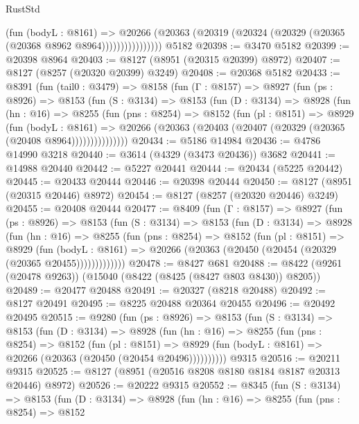 \begin{lexlean}{RustStd}
\begin{coremodule}
                      (fun (bodyL : @8161) =>
                      @20266
                        (@20363 (@20319 (@20324 (@20329 (@20365 (@20368 @8962 @8964))))))))))))))))
    @5182
@20398 := @3470 @5182
@20399 := @20398 @8964
@20403 := @8127 (@8951 (@20315 @20399) @8972)
@20407 := @8127 (@8257 (@20320 @20399) @3249)
@20408 := @20368 @5182
@20433 := @8391
    (fun (tail0 : @3479) =>
    @8158
      (fun (Γ : @8157) =>
      @8927
        (fun (ps : @8926) =>
        @8153
          (fun (S : @3134) =>
          @8153
            (fun (D : @3134) =>
            @8928
              (fun (hn : @16) =>
              @8255
                (fun (pns : @8254) =>
                @8152
                  (fun (pl : @8151) =>
                  @8929
                    (fun (bodyL : @8161) =>
                    @20266 (@20363 (@20403 (@20407 (@20329 (@20365 (@20408 @8964)))))))))))))))
@20434 := @5186 @14984
@20436 := @4786 @14990 @3218
@20440 := @3614 (@4329 (@3473 @20436)) @3682
@20441 := @14988 @20440
@20442 := @5227 @20441
@20444 := @20434 (@5225 @20442)
@20445 := @20433 @20444
@20446 := @20398 @20444
@20450 := @8127 (@8951 (@20315 @20446) @8972)
@20454 := @8127 (@8257 (@20320 @20446) @3249)
@20455 := @20408 @20444
@20477 := @8409
    (fun (Γ : @8157) =>
    @8927
      (fun (ps : @8926) =>
      @8153
        (fun (S : @3134) =>
        @8153
          (fun (D : @3134) =>
          @8928
            (fun (hn : @16) =>
            @8255
              (fun (pns : @8254) =>
              @8152
                (fun (pl : @8151) =>
                @8929
                  (fun (bodyL : @8161) =>
                  @20266 (@20363 (@20450 (@20454 (@20329 (@20365 @20455)))))))))))))
@20478 := @8427 @681
@20488 := @8422 (@9261 (@20478 @9263)) (@15040 (@8422 (@8425 (@8427 @803 @8430)) @8205))
@20489 := @20477 @20488
@20491 := @20327 (@8218 @20488)
@20492 := @8127 @20491
@20495 := @8225 @20488 @20364 @20455
@20496 := @20492 @20495
@20515 := @9280
    (fun (ps : @8926) =>
    @8153
      (fun (S : @3134) =>
      @8153
        (fun (D : @3134) =>
        @8928
          (fun (hn : @16) =>
          @8255
            (fun (pns : @8254) =>
            @8152
              (fun (pl : @8151) =>
              @8929 (fun (bodyL : @8161) => @20266 (@20363 (@20450 (@20454 @20496))))))))))
    @9315
@20516 := @20211 @9315
@20525 := @8127 (@8951 (@20516 @8208 @8180 @8184 @8187 @20313 @20446) @8972)
@20526 := @20222 @9315
@20552 := @8345
    (fun (S : @3134) =>
    @8153
      (fun (D : @3134) =>
      @8928
        (fun (hn : @16) =>
        @8255
          (fun (pns : @8254) =>
          @8152

\end{coremodule}
\end{lexlean}
